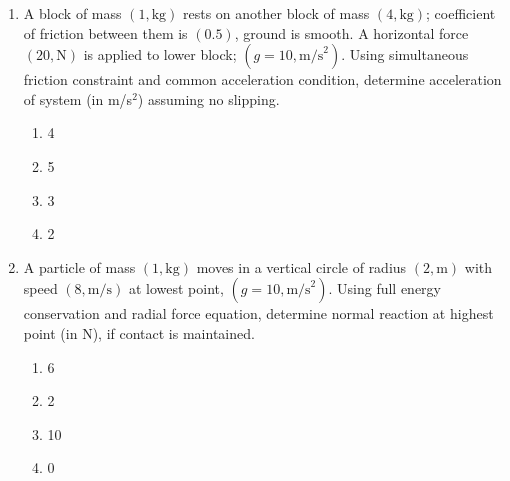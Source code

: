 \documentclass[12pt]{article}
\begin{document}
\begin{enumerate}
\begin{enumerate}[label=\Alph*)]
\item 3.5
\item 2.8
\item 2.5
\item 4.2
\end{enumerate}

\item A block of mass $(1,\text{kg})$ rests on another block of mass $(4,\text{kg})$; coefficient of friction between them is $(0.5)$, ground is smooth. A horizontal force $(20,\text{N})$ is applied to lower block; $(g=10,\text{m/s}^2)$. Using simultaneous friction constraint and common acceleration condition, determine acceleration of system (in m/s$^2$) assuming no slipping.




\begin{center}
\end{center}

\begin{enumerate}[label=\Alph*)]
\item 4
\item 5
\item 3
\item 2
\end{enumerate}

\item A particle of mass $(1,\text{kg})$ moves in a vertical circle of radius $(2,\text{m})$ with speed $(8,\text{m/s})$ at lowest point, $(g=10,\text{m/s}^2)$. Using full energy conservation and radial force equation, determine normal reaction at highest point (in N), if contact is maintained.

\begin{enumerate}[label=\Alph*)]
\item 6
\item 2
\item 10
\item 0
\end{enumerate}

\end{enumerate}
\end{document}
